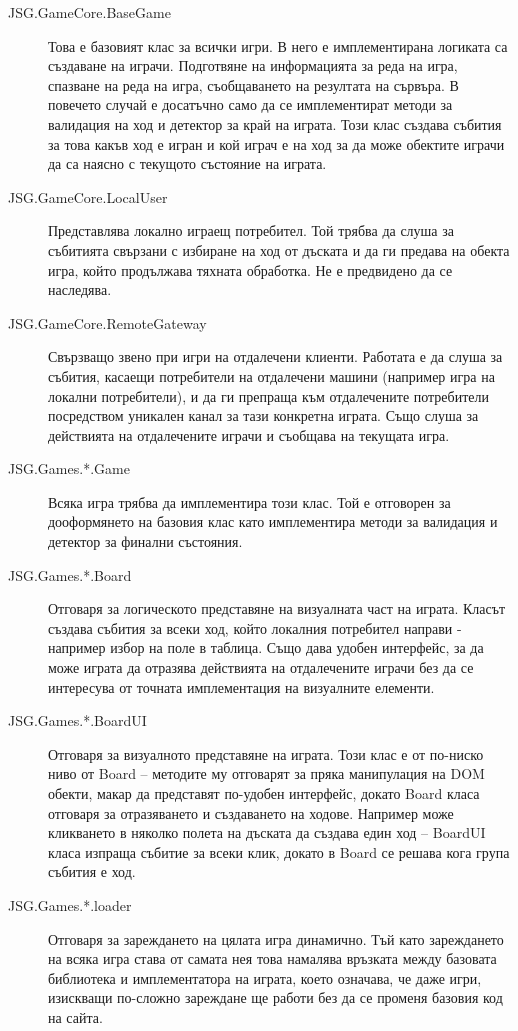 \documentclass[a4paper]{article}
\begin{document}
    \begin{description}
      \item[JSG.GameCore.BaseGame] Това е базовият клас за всички игри. В него е имплементирана логиката са създаване на играчи. Подготвяне на информацията за реда на игра, спазване на реда на игра, съобщаването на резултата на сървъра. В повечето случай е досатъчно само да се имплементират методи за валидация на ход и детектор за край на играта. Този клас създава събития за това какъв ход е игран и кой играч е на ход за да може обектите играчи да са наясно с текущото състояние на играта.
      \item[JSG.GameCore.LocalUser] Представлява локално играещ потребител. Той трябва да слуша за събитията свързани с избиране на ход от дъската и да ги предава на обекта игра, който продължава тяхната обработка. Не е предвидено да се наследява.
      \item[JSG.GameCore.RemoteGateway] Свързващо звено при игри на отдалечени клиенти. Работата е да слуша за събития, касаещи потребители на отдалечени машини (например игра на локални потребители), и да ги препраща към отдалечените потребители посредством уникален канал за тази конкретна играта. Също слуша за действията на отдалечените играчи и съобщава на текущата игра.
      \item[JSG.Games.*.Game] Всяка игра трябва да имплементира този клас. Той е отговорен за дооформянето на базовия клас като имплементира методи за валидация и детектор за финални състояния.
      \item[JSG.Games.*.Board] Отговаря за логическото представяне на визуалната част на играта. Класът създава събития за всеки ход, който локалния потребител направи - например избор на поле в таблица. Също дава удобен интерфейс, за да може играта да отразява действията на отдалечените играчи без да се интересува от точната имплементация на визуалните елементи.
      \item[JSG.Games.*.BoardUI] Отговаря за визуалното представяне на играта. Този клас е от по-ниско ниво от Board -- методите му отговарят за пряка манипулация на DOM обекти, макар да представят по-удобен интерфейс, докато Board класа отговаря за отразяването и създаването на ходове. Например може кликването в няколко полета на дъската да създава един ход -- BoardUI класа изпраща събитие за всеки клик, докато в Board се решава кога група събития е ход.
      \item[JSG.Games.*.loader] Отговаря за зареждането на цялата игра динамично. Тъй като зареждането на всяка игра става от самата нея това намалява връзката между базовата библиотека и имплементатора на играта, което означава, че даже игри, изискващи по-сложно зареждане ще работи без да се променя базовия код на сайта.

\end{description}
\end{document}
